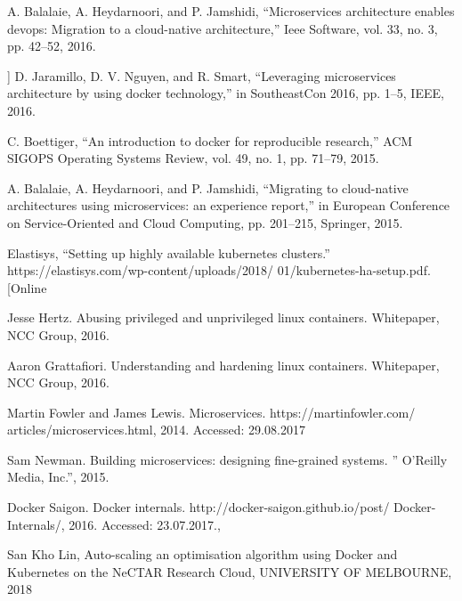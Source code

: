 \documentclass[thesis=M,czech]{FITthesis}[2019/12/23]
\theoremstyle{plain}
\theoremstyle{definition}
\begin{document}
\begin{thebibliography}{9}

A. Balalaie, A. Heydarnoori, and P. Jamshidi, “Microservices architecture enables devops: Migration to a cloud-native architecture,” Ieee Software, vol. 33, no. 3, pp. 42–52, 2016.



] D. Jaramillo, D. V. Nguyen, and R. Smart, “Leveraging microservices architecture by using docker technology,” in SoutheastCon 2016, pp. 1–5, IEEE,
2016.


C. Boettiger, “An introduction to docker for reproducible research,” ACM
SIGOPS Operating Systems Review, vol. 49, no. 1, pp. 71–79, 2015.


	A. Balalaie, A. Heydarnoori, and P. Jamshidi, “Migrating to cloud-native
architectures using microservices: an experience report,” in European Conference on Service-Oriented and Cloud Computing, pp. 201–215, Springer,
2015.



Elastisys, “Setting up highly available kubernetes clusters.”
https://elastisys.com/wp-content/uploads/2018/
01/kubernetes-ha-setup.pdf. [Online



	Jesse Hertz. Abusing privileged and unprivileged linux containers. Whitepaper,
	NCC Group, 2016.


	Aaron Grattafiori. Understanding and hardening linux containers. Whitepaper,
NCC Group, 2016.


Martin Fowler and James Lewis. Microservices. https://martinfowler.com/
articles/microservices.html, 2014. Accessed: 29.08.2017


Sam Newman. Building microservices: designing fine-grained systems. ” O’Reilly
Media, Inc.”, 2015.


Docker Saigon. Docker internals. http://docker-saigon.github.io/post/
Docker-Internals/, 2016. Accessed: 23.07.2017., 



San Kho Lin, Auto-scaling an optimisation algorithm using Docker and Kubernetes on the NeCTAR Research Cloud, UNIVERSITY OF MELBOURNE, 2018



\end{thebibliography}
\end{document}
